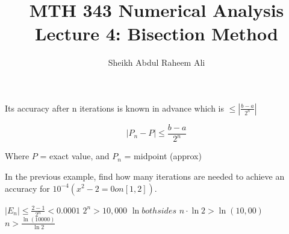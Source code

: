 \documentclass[]{article}
\title{MTH 343 Numerical Analysis Lecture 4: Bisection Method}
\author{Sheikh Abdul Raheem Ali}
\begin{document}
	
	\maketitle
	
	Its accuracy after n iterations is known in advance which is $ \le |\frac{b-a}{2^n}| $
	
	\[ |P_n - P| \le \frac{b-a}{2^n} \]
	
	Where $ P $ = exact value, and $ P_n $ = midpoint (approx)
	
	In the previous example, find how many iterations are needed to achieve an accuracy for $ 10^{-4}  (x^2 - 2 = 0 on [1,2])$.
	
	$ |E_n| \le \frac{2-1}{2^n} < 0.0001 $ 
	$ 2^n > 10,000 $
	$ \ln both sides $
	$ n \cdot \ln2 > \ln(10,00)$
	$ n > \frac{\ln(10000)}{\ln2} $
\end{document}
